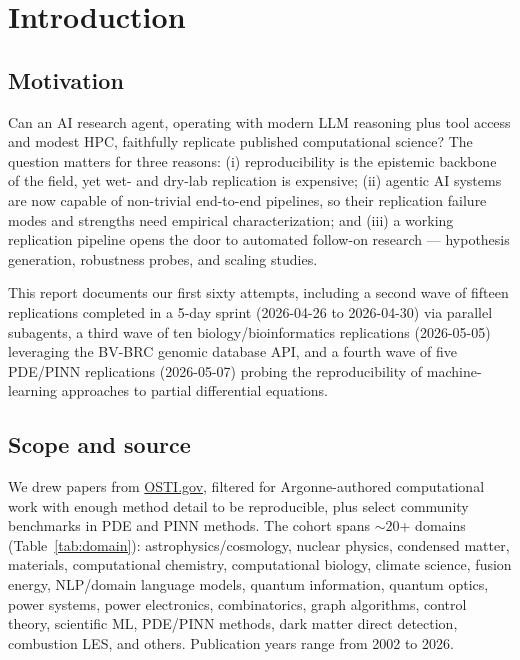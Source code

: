 \section{Introduction}

\subsection{Motivation}
Can an AI research agent, operating with modern LLM reasoning plus tool access
and modest HPC, faithfully replicate published computational science? The
question matters for three reasons: (i) reproducibility is the epistemic
backbone of the field, yet wet- and dry-lab replication is expensive;
(ii) agentic AI systems are now capable of non-trivial end-to-end pipelines,
so their replication failure modes and strengths need empirical characterization;
and (iii) a working replication pipeline opens the door to automated follow-on
research --- hypothesis generation, robustness probes, and scaling studies.

This report documents our first sixty attempts, including a second wave
of fifteen replications completed in a 5-day sprint (2026-04-26 to
2026-04-30) via parallel subagents, a third wave of ten
biology/bioinformatics replications (2026-05-05) leveraging the BV-BRC
genomic database API, and a fourth wave of five PDE/PINN replications
(2026-05-07) probing the reproducibility of machine-learning approaches
to partial differential equations.

\subsection{Scope and source}
We drew papers from \href{https://www.osti.gov}{OSTI.gov}, filtered for
Argonne-authored computational work with enough method detail to be
reproducible, plus select community benchmarks in PDE and PINN methods.
The cohort spans $\sim 20$+ domains
(Table~\ref{tab:domain}): astrophysics/cosmology, nuclear physics, condensed
matter, materials, computational chemistry, computational biology, climate
science, fusion energy, NLP/domain language models, quantum
information, quantum optics, power systems, power electronics, combinatorics,
graph algorithms, control theory, scientific ML, PDE/PINN methods, dark matter direct detection,
combustion LES, and others. Publication years range from 2002 to 2026.


